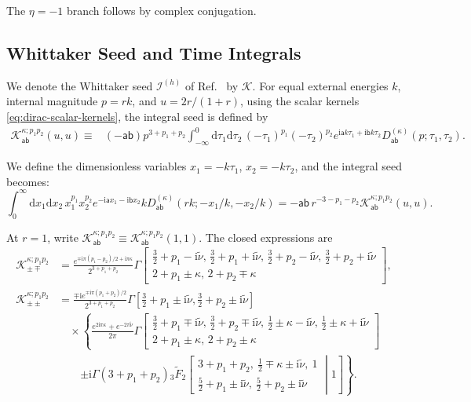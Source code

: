 \documentclass[a4paper,12pt]{article}
\def\di{{\mathrm{d}}}
\def\ii{\mathrm{i}}
\def\tn{\tilde\nu}
\def\aa{\mathsf{a}}
\def\bb{\mathsf{b}}
\begin{document}
The $\eta=-1$ branch follows by complex conjugation.

\subsection{Whittaker Seed and Time Integrals}
\label{app:dirac-seed}
We denote the Whittaker seed $\mathcal I^{(h)}$ of Ref.~\cite{qin_closed-form_2023} by $\mathcal K$.
For equal external energies $k$, internal magnitude $p=rk$, and $u=2r/(1+r)$, using the scalar kernels \eqref{eq:dirac-scalar-kernels}, the integral seed is defined by
\begin{align}
 \mathcal K_{\aa\bb}^{\kappa;p_1p_2}(u,u)
 \equiv{}&(-\aa\bb)p^{3+p_1+p_2}
 \int_{-\infty}^0\di\tau_1\di\tau_2\,
 (-\tau_1)^{p_1}(-\tau_2)^{p_2}
 e^{\ii\aa k\tau_1+\ii\bb k\tau_2}
 D^{(\kappa)}_{\aa\bb}(p;\tau_1,\tau_2).
 \label{eq:dirac-K-definition}
\end{align}

We define the dimensionless variables $x_1=-k\tau_1$, $x_2=-k\tau_2$, and the integral seed becomes:
\begin{equation}
 \int_0^\infty\di x_1\di x_2\,x_1^{p_1}x_2^{p_2}e^{-\ii\aa x_1-\ii\bb x_2}
 kD^{(\kappa)}_{\aa\bb}(rk;-x_1/k,-x_2/k)
 =-\aa\bb\,r^{-3-p_1-p_2}\mathcal K_{\aa\bb}^{\kappa;p_1p_2}(u,u).
 \label{eq:dirac-K-scaling}
\end{equation}

At $r=1$, write $\mathcal K_{\aa\bb}^{\kappa;p_1p_2} \equiv\mathcal K_{\aa\bb}^{\kappa;p_1p_2}(1,1)$.
The closed expressions are
\begin{align}
 \mathcal K_{\pm\mp}^{\kappa;p_1p_2}
 &=\frac{e^{\mp\ii\pi(p_1-p_2)/2+\ii\pi\kappa}}{2^{3+p_1+p_2}}
 \Gamma\!\left[\begin{matrix}
 \tfrac32+p_1-\ii\tn,\,\tfrac32+p_1+\ii\tn,\,
 \tfrac32+p_2-\ii\tn,\,\tfrac32+p_2+\ii\tn\\
 2+p_1\pm\kappa,\,2+p_2\mp\kappa
 \end{matrix}\right],
 \label{eq:dirac-K-opposite}\\
 \mathcal K_{\pm\pm}^{\kappa;p_1p_2}
 &=\frac{\mp\ii e^{\mp\ii\pi(p_1+p_2)/2}}{2^{3+p_1+p_2}}
 \Gamma[\tfrac32+p_1\pm\ii\tn,\tfrac32+p_2\pm\ii\tn]
 \nonumber\\
 &\quad\times\left\{
 \frac{e^{2\ii\pi\kappa}+e^{-2\pi\tn}}{2\pi}
 \Gamma\!\left[\begin{matrix}
 \tfrac32+p_1\mp\ii\tn,\,\tfrac32+p_2\mp\ii\tn,\,
 \tfrac12\pm\kappa-\ii\tn,\,\tfrac12\pm\kappa+\ii\tn\\
 2+p_1\pm\kappa,\,2+p_2\pm\kappa
 \end{matrix}\right]
 \right.\nonumber\\
 &\qquad\left.
 \pm\ii\Gamma(3+p_1+p_2)
 {}_3\widetilde F_2\!\left[
 \begin{matrix}3+p_1+p_2,\ \tfrac12\mp\kappa\pm\ii\tn,\ 1\\
 \tfrac52+p_1\pm\ii\tn,\ \tfrac52+p_2\pm\ii\tn
 \end{matrix}\middle|1\right]\right\}.
 \label{eq:dirac-K-same}
\end{align}
\end{document}
